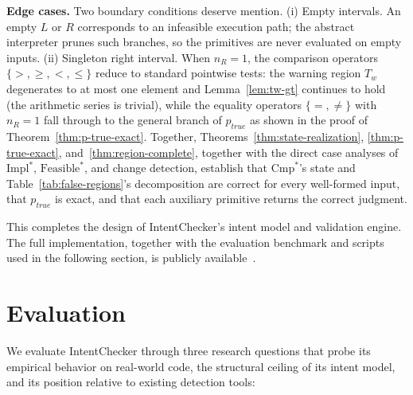 \documentclass[pdflatex,sn-basic]{sn-jnl}%
\theoremstyle{thmstyleone}%
\theoremstyle{thmstyletwo}%
\theoremstyle{thmstylethree}%
\begin{document}
\smallskip
\noindent\textbf{Edge cases.}
Two boundary conditions deserve mention.
(i) Empty intervals. An empty $L$ or $R$ corresponds to an infeasible execution path; the abstract interpreter prunes such branches, so the primitives are never evaluated on empty inputs.
(ii) Singleton right interval. When $n_R = 1$, the comparison operators $\{>, \geq, <, \leq\}$ reduce to standard pointwise tests: the warning region $T_w$ degenerates to at most one element and Lemma~\ref{lem:tw-gt} continues to hold (the arithmetic series is trivial), while the equality operators $\{=, \neq\}$ with $n_R = 1$ fall through to the general branch of $p_{\mathit{true}}$ as shown in the proof of Theorem~\ref{thm:p-true-exact}.
Together, Theorems~\ref{thm:state-realization}, \ref{thm:p-true-exact}, and~\ref{thm:region-complete}, together with the direct case analyses of $\text{Impl}^*$, $\text{Feasible}^*$, and change detection, establish that $\text{Cmp}^*$'s state and Table~\ref{tab:false-regions}'s decomposition are correct for every well-formed input, that $p_{\mathit{true}}$ is exact, and that each auxiliary primitive returns the correct judgment.

This completes the design of IntentChecker's intent model and validation engine. The full implementation, together with the evaluation benchmark and scripts used in the following section, is publicly available~\citep{intentchecker}.

\section{Evaluation}\label{sec:evaluation}

We evaluate IntentChecker through three research questions that probe its empirical behavior on real-world code, the structural ceiling of its intent model, and its position relative to existing detection tools:
\end{document}

